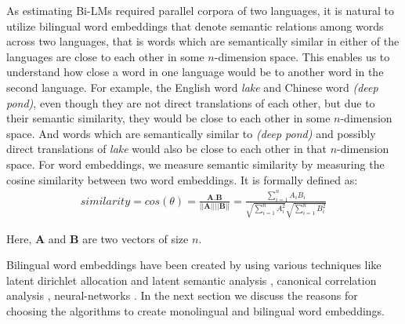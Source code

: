 As estimating Bi-LMs required parallel corpora of two languages, it is natural to utilize bilingual word embeddings that denote semantic relations among words across two languages, that is words which are semantically similar in either of the languages are close to each other in some $n$-dimension space. This enables us to understand how close a word in one language would be to another word in the second language. For example, the English word \textit{lake} and Chinese word  \textit{(deep pond)}, even though they are not direct translations of each other, but due to their semantic similarity, they would be close to each other in some $n$-dimension space. And words which are semantically similar to  \textit{(deep pond)} and possibly direct translations of \textit{lake} would also be close to each other in that $n$-dimension space. For word embeddings, we measure semantic similarity by measuring the cosine similarity between two word embeddings. It is formally defined as:
\begin{eqnarray}
similarity = cos(\theta) = \frac{\textbf{A}.\textbf{B}}{||\textbf{A}|| ||\textbf{B}||} = \frac{\sum_{i=1}^{n}A_iB_i}{\sqrt{\sum_{i=1}^{n}A_i^2} \sqrt{\sum_{i=1}^{n}B_i^2}}
\end{eqnarray}

Here, $\textbf{A}$ and $\textbf{B}$ are two vectors of size $n$.

Bilingual word embeddings have been created by using various techniques like latent dirichlet allocation and latent semantic analysis \cite{BoydGraber2012, Zhao2006}, canonical correlation analysis \cite{Faruqui2014}, neural-networks \cite{Klementiev12, Zou13, Mikolov2013c, Hermann14, Chandar2014}. In the next section we discuss the reasons for choosing the algorithms to create monolingual and bilingual word embeddings.

